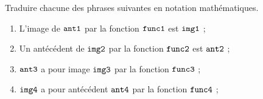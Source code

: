 \documentclass[exercice]{thedocument}%
\begin{document}
%
Traduire chacune des phrases suivantes en notation mathématiques.
\begin{enumerate}
    \item L'image de $\<ant1;$ par la fonction $\<func1;$ est $\<img1;$ ;
    \item Un antécédent de $\<img2;$ par la fonction $\<func2;$ est $\<ant2;$ ;
    \item $\<ant3;$ a pour image $\<img3;$ par la fonction $\<func3;$ ;
    \item $\<img4;$ a pour antécédent $\<ant4;$ par la fonction $\<func4;$ ;
\end{enumerate}
\end{document}
